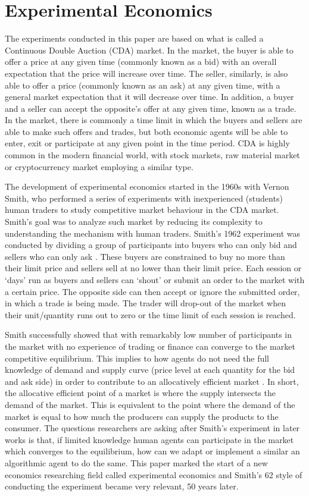 \section{Experimental Economics}
The experiments conducted in this paper are based on what is called a Continuous Double Auction (CDA) market. In the market, the buyer is able to offer a price at any given time (commonly known as a bid) with an overall expectation that the price will increase over time. The seller, similarly, is also able to offer a price (commonly known as an ask)  at any given time, with a general market expectation that it will decrease over time. In addition, a buyer and a seller can accept the opposite’s offer at any given time, known as a trade. In the market, there is commonly a time limit in which the buyers and sellers are able to make such offers and trades, but both economic agents will be able to enter, exit or participate at any given point in the time period. CDA is highly common in the modern financial world, with stock markets, raw material market or cryptocurrency market employing a similar type. 

The development of experimental economics started in the 1960s with Vernon Smith, who performed a series of experiments with inexperienced (students) human traders to study competitive market behaviour in the CDA market. Smith’s goal was to analyze such market by reducing its complexity to understanding the mechanism with human traders. Smith’s 1962 experiment was conducted by dividing a group of participants into buyers who can only bid and sellers who can only ask \cite{smith1962}. These buyers are constrained to buy no more than their limit price and sellers sell at no lower than their limit price. Each session or ‘days’ run as buyers and sellers can ‘shout’ or submit an order to the market with a certain price. The opposite side can then accept or ignore the submitted order, in which a trade is being made. The trader will drop-out of the market when their unit/quantity runs out to zero or the time limit of each session is reached. 

Smith successfully showed that with remarkably low number of participants in the market with no experience of trading or finance can converge to the market competitive equilibrium. This implies to how agents do not need the full knowledge of demand and supply curve (price level at each quantity for the bid and ask side) in order to contribute to an allocatively efficient market \cite{smith1962}. In short, the allocative efficient point of a market is where the supply intersects the demand of the market. This is equivalent to the point where the demand of the market is equal to how much the producers can supply the products to the consumer. The questions researchers are asking after Smith’s experiment in later works is that, if limited knowledge human agents can participate in the market which converges to the equilibrium, how can we adapt or implement a similar an algorithmic agent to do the same. This paper marked the start of a new economics researching field called experimental economics and Smith’s 62 style of conducting the experiment became very relevant, 50 years later.

